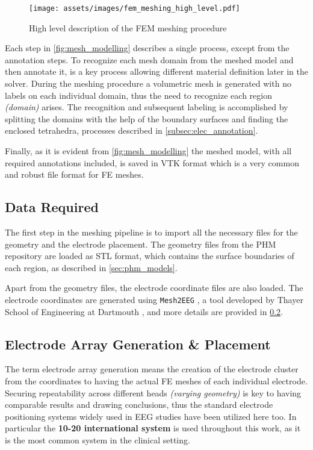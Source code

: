 \begin{figure}[H]
    \centering
    \texttt{[image: assets/images/fem\_meshing\_high\_level.pdf]}
    \caption{High level description of the \gls{FEM} meshing procedure}
    \label{fig:mesh_modelling}
\end{figure}

\noindent Each step in \autoref{fig:mesh_modelling} describes a single process, except from the annotation steps. To recognize each mesh domain from the meshed model and then annotate it, is a key process allowing different material definition later in the solver. During the meshing procedure a volumetric mesh is generated with no labels on each individual domain, thus the need to recognize each region \textit{(domain)} arises. The recognition and subsequent labeling is accomplished by splitting the domains with the help of the boundary surfaces and finding the enclosed tetrahedra, processes described in \ref{subsec:elec_annotation}.

Finally, as it is evident from \autoref{fig:mesh_modelling} the meshed model, with all required annotations included, is saved in \gls{VTK} format which is a very common and robust file format for \gls{FE} meshes.

\subsection{Data Required}

The first step in the meshing pipeline is to import all the necessary files for the geometry and the electrode placement. The geometry files from the \gls{PHM} repository \cite{ErikG.Lee2016} are loaded as \gls{STL} format, which contains the surface boundaries of each region, as described in \ref{sec:phm_models}.

Apart from the geometry files, the electrode coordinate files are also loaded. The electrode coordinates are generated using \texttt{Mesh2EEG} \cite{Giacometti2014}, a tool developed by Thayer School of Engineering at Dartmouth \cite{mesh2eeg_web}, and more details are provided in \ref{subsec:elec_placement}.

\subsection{Electrode Array Generation \& Placement}
\label{subsec:elec_placement}

The term electrode array generation means the creation of the electrode cluster from the coordinates to having the actual \gls{FE} meshes of each individual electrode. Securing repeatability across different heads \textit{(varying geometry)} is key to having comparable results and drawing conclusions, thus the standard electrode positioning systems widely used in \gls{EEG} studies have been utilized here too. In particular the \textbf{10-20 international system} \cite[chapter 13]{Malmivuo1995} is used throughout this work, as it is the most common system in the clinical setting. 

